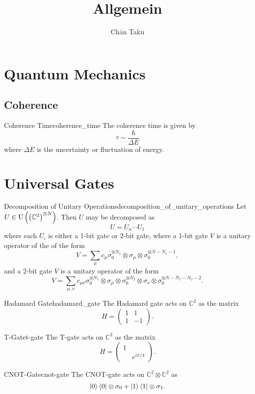 \documentclass{article}
\title{Allgemein}
\author{Ch\=an Taku}
\begin{document}
\maketitle

\section{Quantum Mechanics}

\subsection{Coherence}

\begin{definition}{Coherence Time}{coherence_time}
    The coherence time is given by
    \[ \tau \sim \frac{\hbar}{\Delta E} \]
    where $\Delta E$ is the uncertainty or fluctuation of energy.
\end{definition}

\section{Universal Gates}

\begin{theorem}{Decomposition of Unitary Operations}{decomposition_of_unitary_operations}
    Let $U \in \operatorname{U}\qty(\qty(\mathbb{C}^2)^{\otimes N})$.
    Then $U$ may be decomposed as
    \[ U = U_n \cdots U_1 \]
    where each $U_i$ is either a 1-bit gate or 2-bit gate,
    where a 1-bit gate $V$ is a unitary operator of the of the form
    \[ V = \sum_\mu c_\mu \sigma_0^{\otimes N_1} \otimes \sigma_\mu \otimes \sigma_0^{\otimes N-N_1-1}, \]
    and a 2-bit gate $V$ is a unitary operator of the form
    \[ V = \sum_{\mu,\nu} c_{\mu\nu} \sigma_0^{\otimes N_1} \otimes \sigma_{\mu} \otimes \sigma_0^{\otimes N_2} \otimes \sigma_{\nu} \otimes \sigma_0^{\otimes N - N_1 - N_2 - 2}. \]
\end{theorem}

\begin{theorem}{Hadamard Gate}{hadamard_gate}
    The Hadamard gate acts on $\mathbb{C}^2$ as the matrix
    \[ H = \begin{pmatrix}
        1 & 1 \\ 1 & -1
    \end{pmatrix}. \]
\end{theorem}

\begin{theorem}{T-Gate}{t-gate}
    The T-gate acts on $\mathbb{C}^2$ as the matrix
    \[ H = \begin{pmatrix}
        1 & \\ & e^{i\pi/4}
    \end{pmatrix}. \]
\end{theorem}

\begin{theorem}{CNOT-Gate}{cnot-gate}
    The CNOT-gate acts on $\mathbb{C}^2 \otimes \mathbb{C}^2$ as
    \[ \ket{0}\bra{0} \otimes \sigma_0 + \ket{1}\bra{1} \otimes \sigma_1. \]
\end{theorem}

% 
% 
\end{document}
